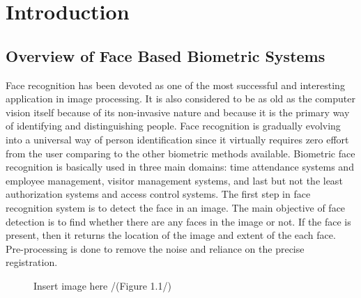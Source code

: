 \chapter{Introduction}
\section{Overview of Face Based Biometric Systems}
Face recognition has been devoted as one of the most successful and interesting application in image processing. It is also considered to be as old as the computer vision itself because of its non-invasive nature and because it is the primary way of identifying and distinguishing people. Face recognition is gradually evolving into a universal way of person identification since it virtually requires zero effort from the user comparing to the other biometric methods available. Biometric face recognition is basically used in three main domains: time attendance systems and employee management, visitor management systems, and last but not the least authorization systems and access control systems.
The first step in face recognition system is to detect the face in an image. The main objective of face detection is to find whether there are any faces in the image or not. If the face is present, then it returns the location of the image and extent of the each face. Pre-processing is done to remove the noise and reliance on the precise registration.
\begin{figure}[h]
	\centering
	Insert image here /(Figure 1.1/)
\end{figure}
\vfill


